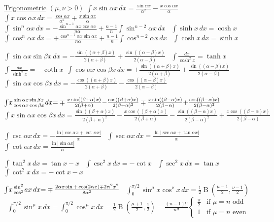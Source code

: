 {\underline{Trigonometric} \scriptsize{$(\mu,\nu>0)$}
$\int\!x\sin\alpha x\,dx{=}\frac{\sin\alpha x}{\alpha^2}{-}\frac{x\cos\alpha x}{\alpha}$ \
$\int\!x\cos\alpha x\,dx{=}\frac{\cos\alpha x}{\alpha^2}{+}\frac{x\sin\alpha x}{\alpha}$ \
$\int\!\sin^n\alpha x\,dx{=}{-}\frac{\sin^{n-1}\alpha x\cos\alpha x}{n\alpha}{+}\frac{n-1}{n}\int\!\sin^{n-2}\alpha x\,dx$ \ $\int\!\sinh x\,dx = \cosh x $
$\int\!\cos^n\alpha x\,dx{=}{+}\frac{\cos^{n-1}\alpha x\sin\alpha x}{n\alpha}{+}\frac{n-1}{n}\int\!\cos^{n-2}\alpha x\,dx$ \ $\int\! \cosh x \, dx = \sinh x$

$\int\!\sin\alpha x\sin\beta x\,dx{=}{-}\frac{\sin((\alpha{+}\beta)x)}{2(\alpha{+}\beta)}{+}\frac{\sin((\alpha{-}\beta)x)}{2(\alpha{-}\beta)}$ \ $\int \! \frac{dx}{\cosh^2 x} = \tanh x $ \ $\int \! \frac{dx}{\sinh^2 x} = -\coth x $\  
$\int\!\cos\alpha x\cos\beta x\,dx{=}{+}\frac{\sin((\alpha{+}\beta)x)}{2(\alpha{+}\beta)}{+}\frac{\sin((\alpha{-}\beta)x)}{2(\alpha{-}\beta)}$ \
$\int\!\sin\alpha x\cos\beta x\,dx{=}{-}\frac{\cos((\alpha{+}\beta)x)}{2(\alpha{+}\beta)}{-}\frac{\cos((\alpha{-}\beta)x)}{2(\alpha{-}\beta)}$

$\int\!x\genfrac{}{}{0pt}{}{\sin\alpha x\sin\beta x}{\cos\alpha x\cos\beta x}dx{=}\mp\frac{x\sin((\beta{+}\alpha)x)}{2(\beta{+}\alpha)}{-}\frac{\cos((\beta{+}\alpha)x)}{2(\beta{+}\alpha)^2}\mp\frac{x\sin((\beta{-}\alpha)x)}{2(\beta{-}\alpha)}{+}\frac{\cos((\beta{-}\alpha)x)}{2(\beta{-}\alpha)^2}$ \
$\int\!x\sin\alpha x\cos\beta x\,dx{=}\frac{\sin((\beta{+}\alpha)x)}{2(\beta{+}\alpha)^2}{-}\frac{x\cos((\beta{+}\alpha)x)}{2(\beta{+}\alpha)}{-}\frac{\sin((\beta{-}\alpha)x)}{2(\beta{-}\alpha)^2}{+}\frac{x\cos((\beta{-}\alpha)x)}{2(\beta{-}\alpha)}$

$\int\!\csc\alpha x\,dx{=}{-}\frac{\ln|\csc\alpha x{+}\cot\alpha x|}{\alpha}$ \
$\int\!\sec\alpha x\,dx{=}\frac{\ln|\sec\alpha x{+}\tan\alpha x|}{\alpha}$ \
$\int\!\cot\alpha x\,dx{=}\frac{\ln|\sin\alpha x|}{\alpha}$

$\int\!\tan^2x\,dx{=}\tan x{-}x$ \
$\int\!\csc^2x\,dx{=}{-}\cot x$ \
$\int\!\sec^2x\,dx{=}\tan x$ \
$\int\!\cot^2x\,dx{=}{-}\cot x{-}x$

$\int\!x\genfrac{}{}{0pt}{}{\sin^2}{\cos^2}ax\,dx{=}\mp\frac{2\alpha x\sin{+}\cos(2\alpha x)\mp2\alpha^2x^2}{8\alpha^2}$ \
$\int_0^{\pi/2}\!\sin^\mu x\cos^\nu x\,dx{=}\frac{1}{2}\operatorname{B}(\frac{\mu-1}{2},\frac{\nu-1}{2})$ \
$\int_0^{\pi/2}\!\sin^\mu x\,dx{=}\int_0^{\pi/2}\!\cos^\mu x\,dx{=}\frac{1}{2}\operatorname{B}(\frac{\mu+1}{2},\frac{1}{2}){=}\frac{(n-1)!!}{n!!}\begin{cases}\frac{\pi}{2}&\text{if }\mu{=}n\text{ odd}\\1&\text{if }\mu{=}n\text{ even}\end{cases}$

}
